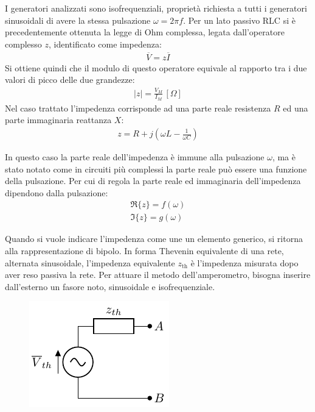 \documentclass{article}
\numberwithin{equation}{subsection}
\begin{document}
I generatori analizzati sono isofrequenziali, proprietà richiesta a tutti i generatori sinusoidali di avere la stessa pulsazione $\omega=2\pi f$. 
Per un lato passivo RLC si è precedentemente ottenuta la legge di Ohm complessa, legata dall'operatore complesso $z$, identificato come impedenza: 
\begin{gather*}
    \overline V=z\overline I
\end{gather*}
Si ottiene quindi che il modulo di questo operatore equivale al rapporto tra i due valori di picco delle due grandezze:
\begin{gather*}
    |z|=\displaystyle\frac{V_M}{I_M}\,[\Omega]
\end{gather*}
Nel caso trattato l'impedenza corrisponde ad una parte reale resistenza $R$ ed una parte immaginaria reattanza $X$:
\begin{gather*}
    z=R+j\left(\displaystyle\omega L-\frac{1}{\omega C}\right)
\end{gather*}

In questo caso la parte reale dell'impedenza è immune alla pulsazione $\omega$, ma è stato notato come in circuiti più complessi la parte reale può essere una funzione della 
pulsazione. Per cui di regola la parte reale ed immaginaria dell'impedenza dipendono dalla pulsazione:
\begin{gather*}
    \Re\{z\}=f(\omega)\\
    \Im\{z\}=g(\omega)
\end{gather*}


Quando si vuole indicare l'impedenza come une un elemento generico, si ritorna alla rappresentazione di bipolo. In forma Thevenin equivalente di una rete, alternata 
sinusoidale, l'impedenza equivalente $z_\mathrm{th}$ è l'impedenza misurata dopo aver reso passiva la rete. Per attuare il metodo dell'amperometro, bisogna inserire dall'esterno un 
fasore noto, sinusoidale e isofrequenziale. 
\begin{figure}[H]%
    \centering
    \includegraphics{rappresentazione-thevenin-fasori.pdf}%
    \label{fig:rappresentazione-thevenin-fasori}
\end{figure}
\end{document}
